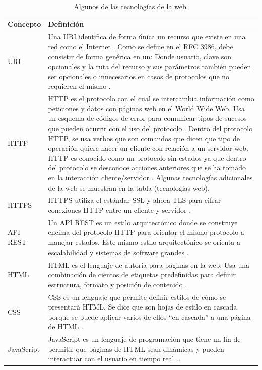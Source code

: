 \begin{table}[h!]
    \begin{tabular}{|p{}|p{}|}
    	\hline
        Concepto & Definición \\
    	\hline
        URI & Una URI identifica de forma única un recurso que existe en una red como el Internet \citep{Webopedia-URI}. Como se define en el RFC 3986, debe consistir de forma genérica en un:
        \newline
[protocolo de acceso][usuario][clave][dominio][ruta de recurso][parámetros de acceso al recurso]
		\newline
Donde usuario, clave son opcionales y la ruta del recurso y sus parámetros también pueden ser opcionales o innecesarios en casos de protocolos que no requieren el mismo \citep{RFC3986}. \\
        \hline
    	HTTP & HTTP es el protocolo con el cual se intercambia información como peticiones y datos con páginas web en el World Wide Web. Usa un esquema de códigos de error para comunicar tipos de sucesos que pueden ocurrir con el uso del protocolo \citep{ComputerHope-HTTP}. Dentro del protocolo HTTP, se usa verbos que son comandos que dicen que tipo de operación quiere hacer un cliente con relación a un servidor web. HTTP es conocido como un protocolo sin estados ya que dentro del protocolo se desconoce acciones anteriores que se ha tomado en la interacción cliente/servidor \citep{Webopedia-HTTP}. Algunas tecnologías adicionales de la web se muestran en la tabla (tecnologias-web). \\
        \hline
        HTTPS & HTTPS utiliza el estándar SSL y ahora TLS para cifrar conexiones HTTP entre un cliente y servidor \citep{ComputerHope-HTTP}. \\
        \hline
        API REST & Un API REST es un estilo arquitectónico donde se construye encima del protocolo HTTP para orientar el mismo protocolo a manejar estados. Este mismo estilo arquitectónico se orienta a escalabilidad y sistemas de software grandes \citep{Webopedia-REST}. \\
        \hline
        HTML & HTML es el lenguaje de autoría para páginas en la web. Usa una combinación de cientos de etiquetas predefinidas para definir estructura, formato y posición de contenido \citep{Webopedia-HTML}. \\
        \hline
        CSS & CSS es un lenguaje que permite definir estilos de cómo se presentará HTML. Se dice que son hojas de estilo en cascada porque se puede aplicar varios de ellos “en cascada” a una página de HTML \citep{Webopedia-CSS}. \\
        \hline
        JavaScript & JavaScript es un lenguaje de programación que tiene un fin de permitir que páginas de HTML sean dinámicas y pueden interactuar con el usuario en tiempo real \citep{Webopedia-JavaScript}.. \\
        \hline
    \end{tabular}
	\caption{Algunos de las tecnologías de la web.}
    \label{tecnologias-web}
\end{table}

